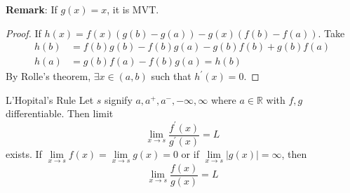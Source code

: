 \documentclass{report}
\begin{document}
\textbf{Remark}: If $g(x) = x$, it is MVT.
    \begin{proof}
        If $h(x) = f(x)(g(b) - g(a)) - g(x)(f(b) - f(a))$. Take
            \begin{align*}
                h(b) &= f(b)g(b) - f(b)g(a) - g(b)f(b) + g(b)f(a) \\
                h(a) &= g(b)f(a) - f(b)g(a) = h(b)                  
            \end{align*}
        By Rolle's theorem, $\exists x \in (a, b)$ such that $h^{\prime}(x) = 0$.
    \end{proof}

\begin{theorem}{L'Hopital's Rule}
    Let $s$ signify $a, a^{+}, a^{-}, -\infty , \infty$ where $a \in \mathbb{R}$ with $f, g$ differentiable. Then limit
        \begin{equation*}
            \lim\limits_{x \to s}\dfrac{f^{\prime}(x)}{g^{\prime}(x)} = L
        \end{equation*}
    exists. If $\lim\limits_{x \to s}f(x) = \lim\limits_{x \to s}g(x) = 0$ or if $\lim\limits_{x \to s}\lvert g(x) \rvert = \infty$, then   
        \begin{equation*}
            \lim\limits_{x \to s}\dfrac{f(x)}{g(x)} = L
        \end{equation*}
\end{theorem}
\end{document}

